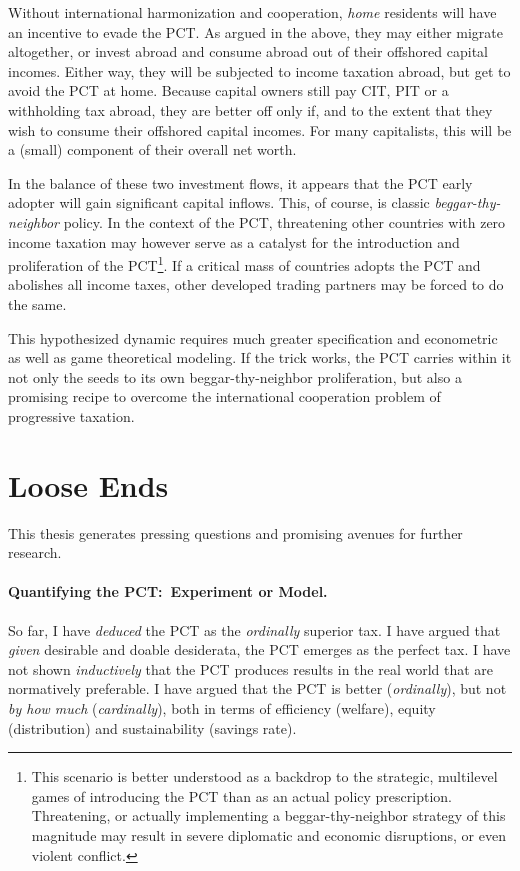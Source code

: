 Without international harmonization and cooperation, \emph{home} residents will have an incentive to evade the PCT.
As argued in the above, they may either migrate altogether, or invest abroad and consume abroad out of their offshored capital incomes.
Either way, they will be subjected to income taxation abroad, but get to avoid the PCT at home.
Because capital owners still pay CIT, PIT or a withholding tax abroad, they are better off only if, and to the extent that they wish to consume their offshored capital incomes.
For many capitalists, this will be a (small) component of their overall net worth.

In the balance of these two investment flows, it appears that the PCT early adopter will gain significant capital inflows.
This, of course, is classic \emph{beggar-thy-neighbor} policy.
In the context of the PCT, threatening other countries with zero income taxation may however serve as a catalyst for the introduction and proliferation of the PCT\footnote{This scenario is better understood as a backdrop to the strategic, multilevel games of introducing the PCT than as an actual policy prescription.
Threatening, or actually implementing a beggar-thy-neighbor strategy of this magnitude may result in severe diplomatic and economic disruptions, or even violent conflict.}.
If a critical mass of countries adopts the PCT and abolishes all income taxes, other developed trading partners may be forced to do the same.

This hypothesized dynamic requires much greater specification and econometric as well as game theoretical modeling.
If the trick works, the PCT carries within it not only the seeds to its own beggar-thy-neighbor proliferation, but also a promising recipe to overcome the international cooperation problem of progressive taxation.

\section{Loose Ends}
	\label{sec:LooseEnds}
This thesis generates pressing questions and promising avenues for further research.

\paragraph{Quantifying the PCT:\ Experiment or Model.}
So far, I have \emph{deduced} the PCT as the \emph{ordinally} superior tax.
I have argued that \emph{given} desirable and doable desiderata, the PCT emerges as the perfect tax.
I have not shown \emph{inductively} that the PCT produces results in the real world that are normatively preferable.
I have argued that the PCT is better (\emph{ordinally}), but not \emph{by how much} (\emph{cardinally}), both in terms of efficiency (welfare), equity (distribution) and sustainability (savings rate).

